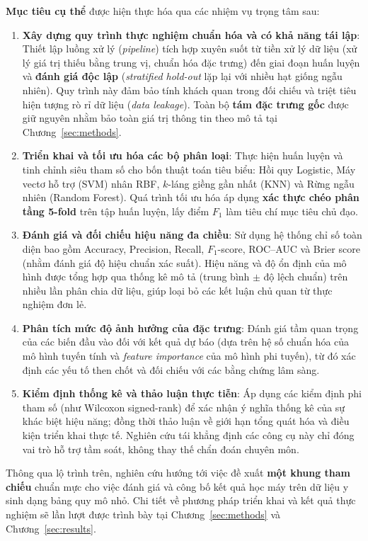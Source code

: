 \documentclass[14pt,a4paper]{extreport}
\begin{document}
\textbf{Mục tiêu cụ thể} được hiện thực hóa qua các nhiệm vụ trọng tâm sau:

\begin{enumerate}
  \item \textbf{Xây dựng quy trình thực nghiệm chuẩn hóa và có khả năng tái lập}: Thiết lập luồng xử lý (\textit{pipeline}) tích hợp xuyên suốt từ tiền xử lý dữ liệu (xử lý giá trị thiếu bằng trung vị, chuẩn hóa đặc trưng) đến giai đoạn huấn luyện và \textbf{đánh giá độc lập} (\textit{stratified hold-out} lặp lại với nhiều hạt giống ngẫu nhiên). Quy trình này đảm bảo tính khách quan trong đối chiếu và triệt tiêu hiện tượng rò rỉ dữ liệu (\textit{data leakage}). Toàn bộ \textbf{tám đặc trưng gốc} được giữ nguyên nhằm bảo toàn giá trị thông tin theo mô tả tại Chương~\ref{sec:methods}.
  \item \textbf{Triển khai và tối ưu hóa các bộ phân loại}: Thực hiện huấn luyện và tinh chỉnh siêu tham số cho bốn thuật toán tiêu biểu: Hồi quy Logistic, Máy vectơ hỗ trợ (SVM) nhân RBF, $k$-láng giềng gần nhất (KNN) và Rừng ngẫu nhiên (Random Forest). Quá trình tối ưu hóa áp dụng \textbf{xác thực chéo phân tầng 5-fold} trên tập huấn luyện, lấy điểm $F_1$ làm tiêu chí mục tiêu chủ đạo.
  \item \textbf{Đánh giá và đối chiếu hiệu năng đa chiều}: Sử dụng hệ thống chỉ số toàn diện bao gồm Accuracy, Precision, Recall, $F_1$-score, ROC--AUC và Brier score (nhằm đánh giá độ hiệu chuẩn xác suất). Hiệu năng và độ ổn định của mô hình được tổng hợp qua thống kê mô tả (trung bình $\pm$ độ lệch chuẩn) trên nhiều lần phân chia dữ liệu, giúp loại bỏ các kết luận chủ quan từ thực nghiệm đơn lẻ.
  \item \textbf{Phân tích mức độ ảnh hưởng của đặc trưng}: Đánh giá tầm quan trọng của các biến đầu vào đối với kết quả dự báo (dựa trên hệ số chuẩn hóa của mô hình tuyến tính và \textit{feature importance} của mô hình phi tuyến), từ đó xác định các yếu tố then chốt và đối chiếu với các bằng chứng lâm sàng.
  \item \textbf{Kiểm định thống kê và thảo luận thực tiễn}: Áp dụng các kiểm định phi tham số (như Wilcoxon signed-rank) để xác nhận ý nghĩa thống kê của sự khác biệt hiệu năng; đồng thời thảo luận về giới hạn tổng quát hóa và điều kiện triển khai thực tế. Nghiên cứu tái khẳng định các công cụ này chỉ đóng vai trò hỗ trợ tầm soát, không thay thế chẩn đoán chuyên môn.
\end{enumerate}

Thông qua lộ trình trên, nghiên cứu hướng tới việc đề xuất \textbf{một khung tham chiếu} chuẩn mực cho việc đánh giá và công bố kết quả học máy trên dữ liệu y sinh dạng bảng quy mô nhỏ. Chi tiết về phương pháp triển khai và kết quả thực nghiệm sẽ lần lượt được trình bày tại Chương~\ref{sec:methods} và Chương~\ref{sec:results}.
\end{document}
